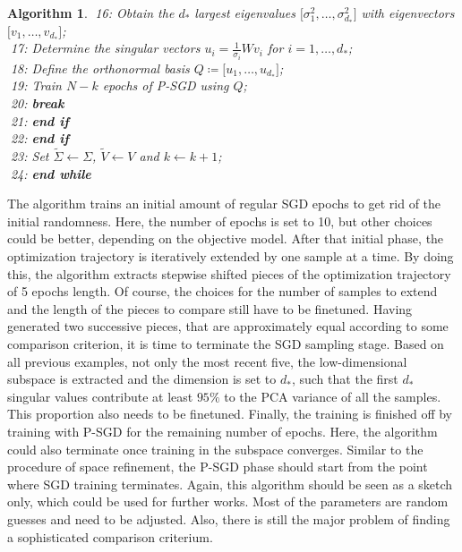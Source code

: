 \documentclass[11pt, a4paper]{article}
\newtheorem{algorithm}[theorem]{Algorithm}
\begin{document}
\begin{algorithm}
\textcolor{white}{$\Big |$}16: \quad \quad \quad Obtain the $d_*$ largest eigenvalues $\big [\sigma_1^2, \dots, \sigma_{d_*}^2 \big ]$ with eigenvectors $ \big [v_1, \dots, v_{d_*} \big ]$; \\
\textcolor{white}{$\Big |$}17: \quad \quad \quad Determine the singular vectors $u_i = \frac{1}{\sigma_i}Wv_i$ for $i=1, \dots, d_*$; \\
\textcolor{white}{$\Big |$}18: \quad \quad \quad Define the orthonormal basis $Q \coloneq \big [u_1, \dots, u_{d_*} \big ]$; \\
\textcolor{white}{$\Big |$}19: \quad \quad \quad Train $N-k$ epochs of P-SGD using $Q$; \\
\textcolor{white}{$\Big |$}20: \quad \quad \quad \textbf{break} \\
\textcolor{white}{$\Big |$}21: \quad \quad \textbf{end if} \\
\textcolor{white}{$\Big |$}22: \quad \textbf{end if} \\
\textcolor{white}{$\Big |$}23: \quad Set $\tilde{\Sigma} \leftarrow \Sigma$, $\tilde{V} \leftarrow V$ and $k \leftarrow k+1$; \\
\textcolor{white}{$\Big |$}24: \textbf{end while} \\
\end{algorithm}

The algorithm trains an initial amount of regular SGD epochs to get rid of the initial randomness. Here, the number of epochs is set to 10, but other choices could be better, depending on the objective model. After that initial phase, the optimization trajectory is iteratively extended by one sample at a time. By doing this, the algorithm extracts stepwise shifted pieces of the optimization trajectory of 5 epochs length. Of course, the choices for the number of samples to extend and the length of the pieces to compare still have to be finetuned. Having generated two successive pieces, that are approximately equal according to some comparison criterion, it is time to terminate the SGD sampling stage. Based on all previous examples, not only the most recent five, the low-dimensional subspace is extracted and the dimension is set to $d_*$, such that the first $d_*$ singular values contribute at least $95\%$ to the PCA variance of all the samples. This proportion also needs to be finetuned. Finally, the training is finished off by training with P-SGD for the remaining number of epochs. Here, the algorithm could also terminate once training in the subspace converges. Similar to the procedure of space refinement, the P-SGD phase should start from the point where SGD training terminates. Again, this algorithm should be seen as a sketch only, which could be used for further works. Most of the parameters are random guesses and need to be adjusted. Also, there is still the major problem of finding a sophisticated comparison criterium. 
\pagebreak
\end{document}
